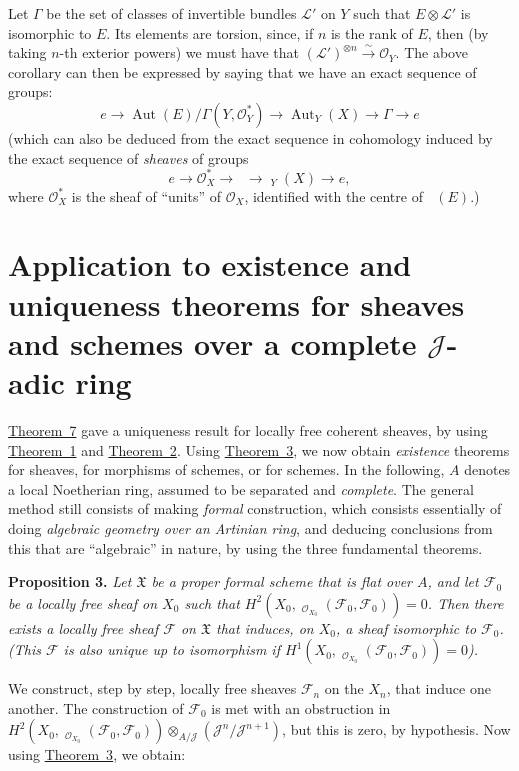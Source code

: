 \documentclass{article}
\newenvironment{itenv}[1]
  {\phantomsection\par\medskip\noindent\textbf{#1.}\itshape}
  {\par\medskip}
\newcommand{\scr}[1]{{\mathscr{#1}}}
\newcommand{\fk}{\mathfrak}
\DeclareMathOperator{\Hom}{Hom}
\DeclareMathOperator{\Aut}{Aut}
\DeclareMathOperator{\shHom}{\underline{\Hom}}
\DeclareMathOperator{\shAut}{\underline{\Aut}}
\newcommand{\oldpage}[1]{\marginpar{\footnotesize$\Big\vert$ \textit{p.~#1}}}
\begin{document}
Let $\Gamma$ be the set of classes of invertible bundles $\scr{L}'$ on $Y$ such that $E\otimes\scr{L}'$ is isomorphic to $E$.
Its elements are torsion, since, if $n$ is the rank of $E$, then (by taking $n$-th exterior powers) we must have that $(\scr{L}')^{\otimes n}\xrightarrow{\sim}\scr{O}_Y$.
The above corollary can then be expressed by saying that we have an exact sequence of groups:
\[
  e \to \Aut(E)/\Gamma(Y,\scr{O}_Y^*) \to \Aut_Y(X) \to \Gamma \to e
\]
(which can also be deduced from the exact sequence in cohomology induced by the exact sequence of \emph{sheaves} of groups
\oldpage{182-11}
\[
  e \to \scr{O}_X^* \to \shAut \to \shAut_Y(X) \to e,
\]
where $\scr{O}_X^*$ is the sheaf of ``units'' of $\scr{O}_X$, identified with the centre of $\shAut(E)$.)


\section{Application to existence and uniqueness theorems for sheaves and schemes over a complete \texorpdfstring{$\mathscr{J}$}{J}-adic ring}
\label{section6}

\hyperref[theorem7]{Theorem~7} gave a uniqueness result for locally free coherent sheaves, by using \hyperref[theorem1]{Theorem~1} and \hyperref[theorem2]{Theorem~2}.
Using \hyperref[theorem3]{Theorem~3}, we now obtain \emph{existence} theorems for sheaves, for morphisms of schemes, or for schemes.
In the following, $A$ denotes a local Noetherian ring, assumed to be separated and \emph{complete}.
The general method still consists of making \emph{formal} construction, which consists essentially of doing \emph{algebraic geometry over an Artinian ring}, and deducing conclusions from this that are ``algebraic'' in nature, by using the three fundamental theorems.

\begin{itenv}{Proposition 3}
\label{proposition3}
  Let $\fk{X}$ be a proper formal scheme that is flat over $A$, and let $\scr{F}_0$ be a locally free sheaf on $X_0$ such that $H^2(X_0,\shHom_{\scr{O}_{X_0}}(\scr{F}_0,\scr{F}_0))=0$.
  Then there exists a locally free sheaf $\scr{F}$ on $\fk{X}$ that induces, on $X_0$, a sheaf isomorphic to $\scr{F}_0$.
  (This $\scr{F}$ is also unique up to isomorphism if $H^1(X_0,\shHom_{\scr{O}_{X_0}}(\scr{F}_0,\scr{F}_0))=0$).
\end{itenv}

We construct, step by step, locally free sheaves $\scr{F}_n$ on the $X_n$, that induce one another.
The construction of $\scr{F}_0$ is met with an obstruction in $H^2(X_0,\shHom_{\scr{O}_{X_0}}(\scr{F}_0,\scr{F}_0))\otimes_{A/\scr{J}}(\scr{J}^n/\scr{J}^{n+1})$, but this is zero, by hypothesis.
Now using \hyperref[theorem3]{Theorem~3}, we obtain:
\end{document}
